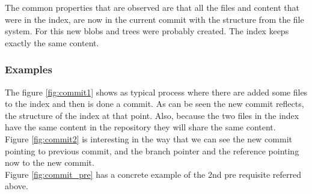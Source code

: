 The common properties that are observed are that all the files and
content that were in the index, are now in the current commit with the
structure from the file system. For this new blobs and trees were
probably created. The index keeps exactly the same content.

\subsubsection{Examples}

The figure \ref{fig:commit1} shows as typical process where there are added
some files to the index and then is done a commit. As can be seen the new commit
reflects, the structure of the index at that point. Also, because the two files
in the index have the same content in the repository they will share the same
content. \\ 
Figure \ref{fig:commit2} is interesting in the way that we can see the new
commit pointing to previous commit, and the branch pointer and the reference
pointing now to the new commit. \\
Figure \ref{fig:commit_pre} has a concrete example of the 2nd pre requisite
referred above. \\

